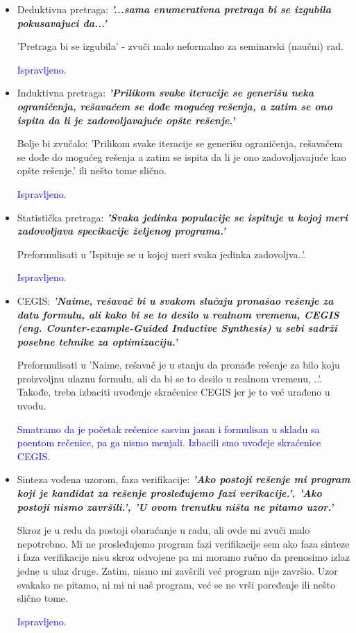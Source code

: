\documentclass[a4paper]{report}
\newcommand{\odgovor}[1]{\textcolor{blue}{#1}}
\begin{document}
\begin{itemize}
    \item Deduktivna pretraga: \textbf{\textit{'...sama enumerativna pretraga bi se izgubila pokusavajuci da...'}}

    'Pretraga bi se izgubila' - zvuči malo neformalno za seminarski (naučni) rad.

    \odgovor {Ispravljeno.}

    \item Induktivna pretraga: \textbf{\textit{'Prilikom svake iteracije se generišu neka ograničenja, rešavačem se dođe mogućeg rešenja, a zatim se ono ispita da li je zadovoljavajuće opšte
rešenje.'}}

	Bolje bi zvučalo: 'Prilikom svake iteracije se generišu ograničenja, rešavačem se dođe do mogućeg rešenja a zatim se ispita da li je ono zadovoljavajuće kao opšte rešenje.' ili nešto tome slično.

    \odgovor {Ispravljeno.}

    \item Statistička pretraga: \textbf{\textit{'Svaka jedinka populacije se ispituje u kojoj meri zadovoljava specikacije željenog programa.'}}

    Preformulisati u 'Ispituje se u kojoj meri svaka jedinka zadovoljva..'.

    \odgovor {Ispravljeno.}

    \item CEGIS: \textbf{\textit{'Naime, rešavač bi u svakom slučaju pronašao rešenje za datu formulu, ali kako bi se to desilo u realnom vremenu, CEGIS (eng. Counter-example-Guided Inductive Synthesis) u sebi sadrži posebne tehnike za optimizaciju.'}}

    Preformulisati u 'Naime, rešavač je u stanju da pronađe rešenje za bilo koju proizvoljnu ulaznu formulu, ali da bi se to desilo u realnom vremenu, ..'. Takođe, treba izbaciti uvođenje skraćenice CEGIS jer je to već urađeno u uvodu.

    \odgovor {Smatramo da je početak rečenice sasvim jasan i formulisan u skladu sa poentom rečenice, pa ga nismo menjali. Izbacili smo uvođeje skraćenice CEGIS.}

    \item Sinteza vođena uzorom, faza verifikacije: \textbf{\textit{'Ako postoji rešenje mi program koji je kandidat za rešenje prosleđujemo fazi verikacije.', 'Ako postoji nismo završili.', 'U ovom trenutku ništa ne pitamo uzor.'}}

    Skroz je u redu da postoji obaraćanje u radu, ali ovde mi zvuči malo nepotrebno. Mi ne prosleđujemo program fazi verifikacije sem ako faza sinteze i faza verifikacije nisu skroz odvojene pa mi moramo ručno da prenosimo izlaz jedne u ulaz druge. Zatim, nismo mi zavšrili već program nije završio. Uzor svakako ne pitamo, ni mi ni naš program, već se ne vrši poređenje ili nešto slično tome.

    \odgovor{Ispravljeno.}

\end{itemize}
\end{document}
